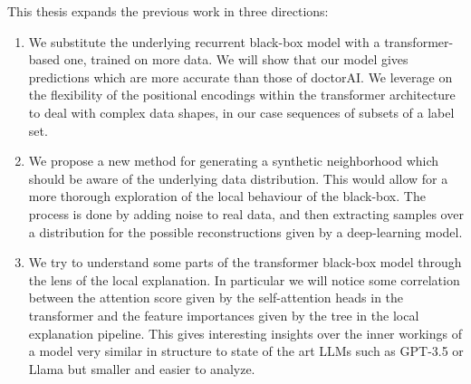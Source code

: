 \documentclass[]{marticle}
\begin{document}
This thesis expands the previous work in three directions:
\begin{enumerate}

\item We substitute the underlying recurrent black-box model with a transformer-based one, trained
on more data. We will show that our model gives predictions which are more accurate than those of
doctorAI. We leverage on the flexibility of the positional encodings within the transformer
architecture to deal with complex data shapes, in our case sequences of subsets of a label set.

\item We propose a new method for generating a synthetic neighborhood which should be aware of the
underlying data distribution. This would allow for a more thorough exploration of the local behaviour
of the black-box. The process is done by adding noise to real data, and then extracting
samples over a distribution for the possible reconstructions given by a deep-learning model.

\item We try to understand some parts of the transformer black-box model through the lens of the
local explanation. In particular we will notice some correlation between the attention score given
by the self-attention heads in the transformer and the feature importances given by the tree in the
local explanation pipeline. This gives interesting insights over the inner workings of a model very
similar in structure to state of the art LLMs such as GPT-3.5 or Llama but smaller and easier to
analyze.

\end{enumerate}
\end{document}
